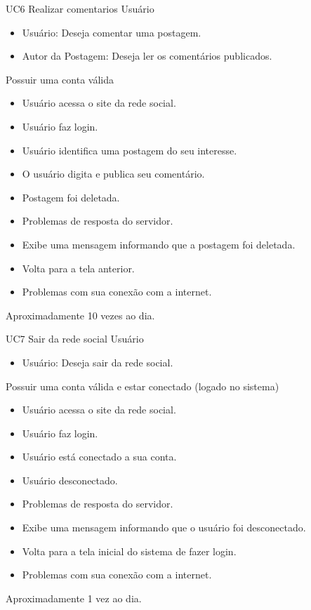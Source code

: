 \casoDeUso
{UC6}
{Realizar comentarios}
{Usuário}
{
\begin{itemize}
	\item Usuário: Deseja comentar uma postagem.
	\item Autor da Postagem: Deseja ler os comentários publicados.
\end{itemize}

}
{Possuir uma conta válida}
{}
{
\begin{itemize}
\item Usuário acessa o site da rede social.
\item Usuário faz login.
\item Usuário identifica uma postagem do seu interesse.
\item O usuário digita e publica seu comentário.
\end{itemize}
}
{
\begin{itemize}
\item Postagem foi deletada.
\item Problemas de resposta do servidor.
\item Exibe uma mensagem informando que a postagem foi deletada.
\item Volta para a tela anterior.
\item Problemas com sua conexão com a internet.
\end{itemize}
}
{Aproximadamente 10 vezes ao dia.}
{

}

\casoDeUso
{UC7}
{Sair da rede social}
{Usuário}
{
\begin{itemize}
	\item Usuário: Deseja sair da rede social.
\end{itemize}

}
{Possuir uma conta válida e estar conectado (logado no sistema)}
{}
{
\begin{itemize}
	\item Usuário acessa o site da rede social.
	\item Usuário faz login.
	\item Usuário está conectado a sua conta.
\end{itemize}
}
{
\begin{itemize}
	\item Usuário desconectado.
	\item Problemas de resposta do servidor.
	\item Exibe uma mensagem informando que o usuário foi desconectado.
	\item Volta para a tela inicial do sistema de fazer login.
	\item Problemas com sua conexão com a internet.
\end{itemize}
}
{Aproximadamente 1 vez ao dia.}
{

}